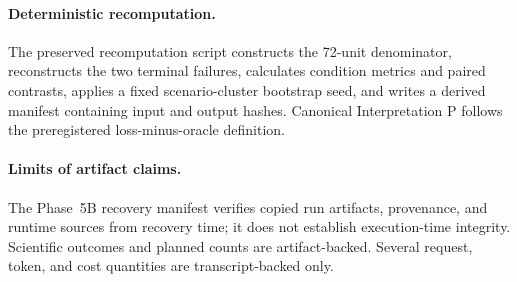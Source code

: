 \paragraph{Deterministic recomputation.}
The preserved recomputation script constructs the 72-unit denominator,
reconstructs the two terminal failures, calculates condition metrics and
paired contrasts, applies a fixed scenario-cluster bootstrap seed, and writes
a derived manifest containing input and output hashes.  Canonical
Interpretation P follows the preregistered loss-minus-oracle definition.

\paragraph{Limits of artifact claims.}
The Phase~5B recovery manifest verifies copied run artifacts, provenance, and
runtime sources from recovery time; it does not establish execution-time
integrity.  Scientific outcomes and planned counts are artifact-backed.
Several request, token, and cost quantities are transcript-backed only.
